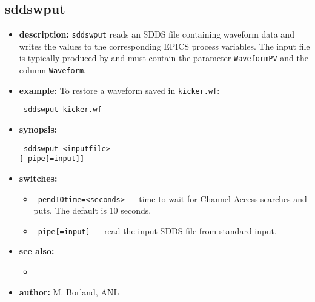 \begin{latexonly}
\newpage
\end{latexonly}

\subsection{sddswput}
\label{sddswput}

\begin{itemize}
\item {\bf description:}
  \verb+sddswput+ reads an SDDS file containing waveform data and writes the
  values to the corresponding EPICS process variables.  The input file is
  typically produced by  and must contain the parameter
  \verb|WaveformPV| and the column \verb|Waveform|.

\item {\bf example:}
  To restore a waveform saved in \verb|kicker.wf|:
  \begin{flushleft}{\tt
  sddswput kicker.wf
  }\end{flushleft}

\item {\bf synopsis:}
  \begin{flushleft}{\tt
  sddswput <inputfile>\\
      [-pendIOtime=<seconds>] [-pipe[=input]]
  }\end{flushleft}

\item {\bf switches:}
  \begin{itemize}
  \item {\tt -pendIOtime=<seconds>} --- time to wait for Channel Access searches and puts. The default is 10 seconds.
  \item {\tt -pipe[=input]} --- read the input SDDS file from standard input.
  \end{itemize}

\item {\bf see also:}
  \begin{itemize}
  \item {}
  \end{itemize}

\item {\bf author:} M. Borland, ANL
\end{itemize}
